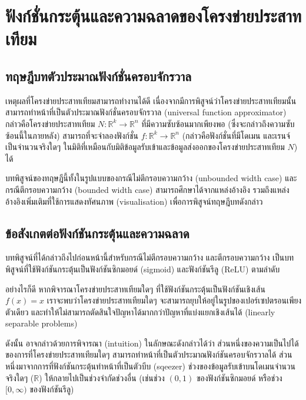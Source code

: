 \documentclass{cpereport}
\begin{document}
\section{ฟังก์ชั่นกระตุ้นและความฉลาดของโครงข่ายประสาทเทียม}
\subsection{ทฤษฎีบทตัวประมาณฟังก์ชั่นครอบจักรวาล}
เหตุผลที่โครงข่ายประสาทเทียมสามารถทำงานได้ดี เนื่องจากมีการพิสูจน์ว่าโครงข่ายประสาทเทียมนั้นสามารถทำหน้าที่เป็นตัวประมาณฟังก์ชั่นครอบจักรวาล \cite{hornik_1991} (universal function approximator) กล่าวคือโครงข่ายประสาทเทียม $N: \mathbb{R} ^k \rightarrow \mathbb{R} ^n$ ที่มีความซับซ้อนมากเพียงพอ (ซึ่งจะกล่าวถึงความซับซ้อนนี้ในภายหลัง) สามารถที่จะจำลองฟังก์ชั่น $f: \mathbb{R}^k \rightarrow \mathbb{R}^n$ (กล่าวคือฟังก์ชั่นที่มีโดเมน และเรนจ์ เป็นจำนวนจริงใดๆ ในมิติที่เหมือนกับมิติข้อมูลรับเข้าและข้อมูลส่งออกของโครงข่ายประสาทเทียม $N$) ได้ \cite{Cybenko1989} \cite{Leshno1993} \cite{1910.03344}

บทพิสูจน์ของทฤษฎีนี้ทั้งในรูปแบบของกรณีไม่ตีกรอบความกว้าง (unbounded width case) และกรณีตีกรอบความกว้าง (bounded width case) สามารถศึกษาได้จากแหล่งอ้างอิง รวมถึงแหล่งอ้างอิงเพิ่มเติมที่ใช้การแสดงทัศนภาพ (visualisation) เพื่อการพิสูจน์ทฤษฎีบทดังกล่าว \cite{nielsen_1970}

\subsection{ข้อสังเกตต่อฟังก์ชันกระตุ้นและความฉลาด}

บทพิสูจน์ที่ได้กล่าวถึงไปก่อนหน้านี้สำหรับกรณีไม่ตีกรอบความกว้าง และตีกรอบความกว้าง เป็นบทพิสูจน์ที่ใช้ฟังก์ชันกระตุ้นเป็นฟังก์ชันซิกมอยด์ (sigmoid) และฟังก์ชันรีลู (ReLU) ตามลำดับ

อย่างไรก็ดี หากพิจารณาโครงข่ายประสาทเทียมใดๆ ที่ใช้ฟังก์ชันกระตุ้นเป็นฟังก์ชันเชิงเส้น $f(x) = x$ เราจะพบว่าโครงข่ายประสาทเทียมใดๆ จะสามารถยุบให้อยู่ในรูปของเปอร์เซปตรอนเพียงตัวเดียว และทำให้ไม่สามารถตัดสินใจปัญหาได้มากกว่าปัญหาที่แบ่งแยกเชิงเส้นได้ (linearly separable problems)

ดังนั้น อาจกล่าวด้วยการพิจารณา (intuition) ในลักษณะดังกล่าวได้ว่า ส่วนหนึ่งของความเป็นไปได้ของการที่โครงข่ายประสาทเทียมใดๆ สามารถทำหน้าที่เป็นตัวประมาณฟังก์ชันครอบจักรวาลได้ ส่วนหนึ่งมาจากการที่ฟังก์ชันกระตุ้นทำหน้าที่เป็นตัวบีบ (sqeezer) ช่วงของข้อมูลรับเข้าบนโดเมนจำนวนจริงใดๆ ($\mathbb{R}$) ให้กลายไปเป็นช่วงจำกัดช่วงอื่น (เช่นช่วง $(0, 1)$ ของฟังก์ชันซิกมอยด์ หรือช่วง $[0, \infty)$ ของฟังก์ชันรีลู)
\end{document}
